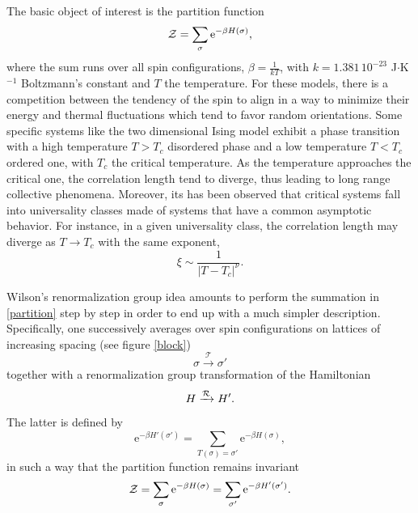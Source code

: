 \documentclass[10pt,here,feynmf]{article}
\begin{document}
The basic object of interest is the partition function
 \begin{equation}
{\cal Z}=\mathop{\sum}\limits_{\sigma}\mathrm{e}^{-\beta H(\sigma)},\label{partition}
\end{equation}
where the sum runs over all spin configurations, $\beta=\frac{1}{kT}$, with $k=1.381\,10^{-23}$ J$\cdot$K$^{-1}$ Boltzmann's constant and $T$ the temperature. For these models,   there is a competition between the tendency of the spin to align in a way to minimize their energy and thermal fluctuations which tend to favor random orientations. Some specific systems like the two dimensional Ising model exhibit a phase transition with a high temperature $T>T_{c}$ disordered phase and a low temperature $T<T_{c}$ ordered one, with $T_{c}$ the critical temperature. As the temperature approaches the critical one, the correlation length tend to diverge, thus leading to long range collective phenomena. Moreover, its has been observed that critical systems fall into universality classes made of systems that have a common asymptotic behavior. For instance, in a given universality class, the correlation length may diverge as $T\rightarrow T_{c}$ with the same exponent,
\begin{equation}
\xi\sim\frac{1}{|T-T_{c}|^{\nu}}.
\end{equation}

Wilson's renormalization group idea  amounts to perform the summation in \eqref{partition} step by step in order to end up with a much simpler description. Specifically, one successively averages over spin configurations  on lattices of increasing spacing (see figure \ref{block})
\begin{equation}
\sigma\xrightarrow{\mathcal{T}}\sigma'
\end{equation}
together with a renormalization group transformation of the Hamiltonian
\begin{equation}
H\xrightarrow{{\cal R}}H'.
\end{equation}
The latter is defined by
\begin{equation}
\mathrm{e}^{-\beta H'(\sigma')}=
\mathop{\sum}\limits_{T(\sigma)=\sigma'}\mathrm{e}^{-\beta H(\sigma)},
\end{equation}
in such a way that the partition function remains invariant
\begin{equation}
{\cal Z}=\mathop{\sum}\limits_{\sigma}\mathrm{e}^{-\beta H(\sigma)}
=\mathop{\sum}\limits_{\sigma'}\mathrm{e}^{-\beta H'(\sigma')}.
\end{equation}
\end{document}

